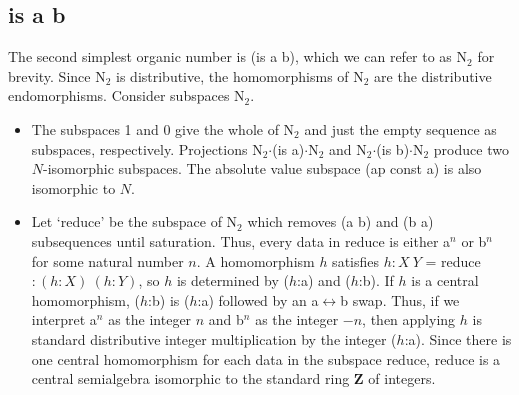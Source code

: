 \documentclass[11pt]{article}
\begin{document}
\subsection{is a b} 

The second simplest organic number is (is a b), which we can refer to as N$_2$ for brevity.  Since N$_2$ is distributive, the homomorphisms of N$_2$ 
are the distributive endomorphisms.  Consider subspaces N$_2$.  

\begin{itemize}
\item{The subspaces 1 and 0 give the whole of N$_2$ and just the empty sequence as subspaces, respectively.  
Projections N$_2$$\cdot$(is a)$\cdot$N$_2$ and N$_2$$\cdot$(is b)$\cdot$N$_2$ produce two $N$-isomorphic subspaces. The absolute value 
subspace (ap const a) is also isomorphic to $N$.}

\item{Let `reduce' be the subspace of N$_2$ which removes (a b) and (b a) subsequences until saturation.  Thus, every data in reduce
is either a$^n$ or b$^n$ for some natural number $n$.  A homomorphism $h$ satisfies $h:X\ Y$ = reduce $:(h:X)\ (h:Y)$, so 
$h$ is determined by ($h$:a) and ($h$:b).  If $h$ is a central homomorphism, ($h$:b) is ($h$:a) followed by an 
a$\leftrightarrow$b swap.  Thus, if we interpret a$^n$ as the integer $n$ and b$^n$ as the integer $-n$, then applying $h$ 
is standard distributive integer multiplication by the integer ($h$:a).  Since there is one central homomorphism for each data in the subspace reduce, 
reduce is a central semialgebra isomorphic to the standard ring $\mathbf Z$ of integers.}


\end{itemize}
\end{document}
